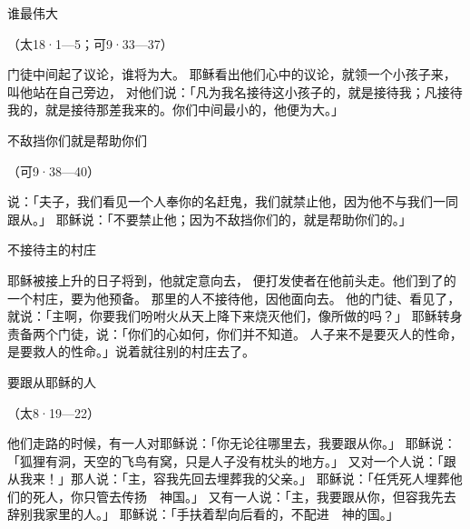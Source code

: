 {\par }{\SH 谁最伟大
\par }{\R （太18·1—5；可9·33—37）
\par }{\PP {}门徒中间起了议论，谁将为大。
耶稣看出他们心中的议论，就领一个小孩子来，叫他站在自己旁边，
对他们说：「凡为我名接待这小孩子的，就是接待我；凡接待我的，就是接待那差我来的。你们中间最小的，他便为大。」
\par }{\SH 不敌挡你们就是帮助你们
\par }{\R （可9·38—40）
\par }{\PP {}说：「夫子，我们看见一个人奉你的名赶鬼，我们就禁止他，因为他不与我们一同跟从{}。」
耶稣说：「不要禁止他；因为不敌挡你们的，就是帮助你们的。」
\par }{\SH 不接待主的村庄
\par }{\PP {}耶稣被接上升的日子将到，他就定意向{}去，
便打发使者在他前头走。他们到了{}的一个村庄，要为他预备。
那里的人不接待他，因他面向{}去。
他的门徒{}、{}看见了，就说：「主啊，你要我们吩咐火从天上降下来烧灭他们，像{}所做的吗？」
耶稣转身责备两个门徒，说：「你们的心如何，你们并不知道。
人子来不是要灭人的性命，是要救人的性命。」说着就往别的村庄去了。
\par }{\SH 要跟从耶稣的人
\par }{\R （太8·19—22）
\par }{\PP {}他们走路的时候，有一人对耶稣说：「你无论往哪里去，我要跟从你。」
耶稣说：「狐狸有洞，天空的飞鸟有窝，只是人子没有枕头的地方。」
又对一个人说：「跟从我来！」那人说：「主，容我先回去埋葬我的父亲。」
耶稣说：「任凭死人埋葬他们的死人，你只管去传扬　神国{}。」
又有一人说：「主，我要跟从你，但容我先去辞别我家里的人。」
耶稣说：「手扶着犁向后看的，不配进　神的国。」

}
